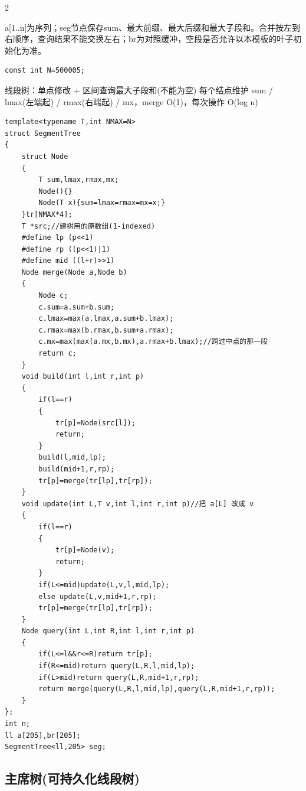 \documentclass[UTF8,fontset=fandol,a4paper,twoside]{ctexart}
\newcommand{\note}[1]{{\fontsize{10}{12}\selectfont #1\par}}
\begin{document}
\begin{multicols}{2}
\note{a[\allowbreak{}1.\allowbreak{}.\allowbreak{}n]\allowbreak{}为序列；seg节点保存sum、最大前缀、最大后缀和最大子段和。合并按左到右顺序，查询结果不能交换左右；br为对照缓冲，空段是否允许以本模板的叶子初始化为准。}
\begin{lstlisting}
const int N=500005;
\end{lstlisting}
\note{线段树：单点修改 +\allowbreak{} 区间查询最大子段和(\allowbreak{}不能为空)\allowbreak{} 每个结点维护 sum /\allowbreak{} lmax(\allowbreak{}左端起)\allowbreak{} /\allowbreak{} rmax(\allowbreak{}右端起)\allowbreak{} /\allowbreak{} mx，merge O(\allowbreak{}1)\allowbreak{}，每次操作 O(\allowbreak{}log n)\allowbreak{}}
\begin{lstlisting}
template<typename T,int NMAX=N>
struct SegmentTree
{
    struct Node
    {
        T sum,lmax,rmax,mx;
        Node(){}
        Node(T x){sum=lmax=rmax=mx=x;}
    }tr[NMAX*4];
    T *src;//建树用的原数组(1-indexed)
    #define lp (p<<1)
    #define rp ((p<<1)|1)
    #define mid ((l+r)>>1)
    Node merge(Node a,Node b)
    {
        Node c;
        c.sum=a.sum+b.sum;
        c.lmax=max(a.lmax,a.sum+b.lmax);
        c.rmax=max(b.rmax,b.sum+a.rmax);
        c.mx=max(max(a.mx,b.mx),a.rmax+b.lmax);//跨过中点的那一段
        return c;
    }
    void build(int l,int r,int p)
    {
        if(l==r)
        {
            tr[p]=Node(src[l]);
            return;
        }
        build(l,mid,lp);
        build(mid+1,r,rp);
        tr[p]=merge(tr[lp],tr[rp]);
    }
    void update(int L,T v,int l,int r,int p)//把 a[L] 改成 v
    {
        if(l==r)
        {
            tr[p]=Node(v);
            return;
        }
        if(L<=mid)update(L,v,l,mid,lp);
        else update(L,v,mid+1,r,rp);
        tr[p]=merge(tr[lp],tr[rp]);
    }
    Node query(int L,int R,int l,int r,int p)
    {
        if(L<=l&&r<=R)return tr[p];
        if(R<=mid)return query(L,R,l,mid,lp);
        if(L>mid)return query(L,R,mid+1,r,rp);
        return merge(query(L,R,l,mid,lp),query(L,R,mid+1,r,rp));
    }
};
int n;
ll a[205],br[205];
SegmentTree<ll,205> seg;
\end{lstlisting}
\subsection{主席树(可持久化线段树)}


\end{multicols}
\end{document}
